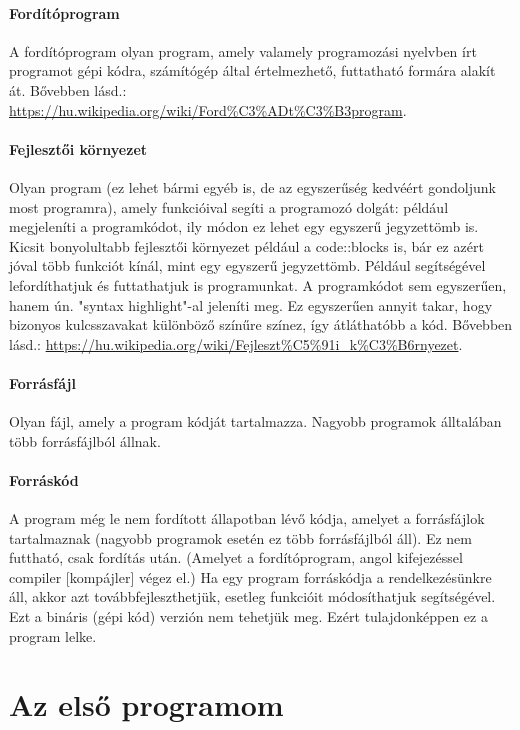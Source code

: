 \paragraph{Fordítóprogram} A fordítóprogram olyan program, amely valamely programozási nyelvben írt programot gépi kódra, számítógép által értelmezhető, futtatható formára alakít át. Bővebben lásd.: \url{https://hu.wikipedia.org/wiki/Ford%C3%ADt%C3%B3program}.

\paragraph{Fejlesztői környezet}
Olyan program (ez lehet bármi egyéb is, de az egyszerűség kedvéért gondoljunk most programra), amely funkcióival segíti a programozó dolgát: például megjeleníti a programkódot, ily módon ez lehet egy egyszerű jegyzettömb is. Kicsit bonyolultabb fejlesztői környezet például a code::blocks is, bár ez azért jóval több funkciót kínál, mint egy egyszerű jegyzettömb. Például segítségével lefordíthatjuk és futtathatjuk is programunkat. A programkódot sem egyszerűen, hanem ún. "syntax highlight"-al jeleníti meg. Ez egyszerűen annyit takar, hogy bizonyos kulcsszavakat különböző színűre színez, így átláthatóbb a kód. Bővebben lásd.: \url{https://hu.wikipedia.org/wiki/Fejleszt%C5%91i_k%C3%B6rnyezet}.

\paragraph{Forrásfájl}
Olyan fájl, amely a program kódját tartalmazza. Nagyobb programok álltalában több forrásfájlból állnak.

\paragraph{Forráskód} A program még le nem fordított állapotban lévő kódja, amelyet a forrásfájlok tartalmaznak (nagyobb programok esetén ez több forrásfájlból áll). Ez nem futtható, csak fordítás után. (Amelyet a fordítóprogram, angol kifejezéssel compiler [kompájler] végez el.) Ha egy program forráskódja a rendelkezésünkre áll, akkor azt továbbfejleszthetjük, esetleg funkcióit módosíthatjuk segítségével. Ezt a bináris (gépi kód) verzión nem tehetjük meg. Ezért tulajdonképpen ez a program lelke.

\section{Az első programom}
